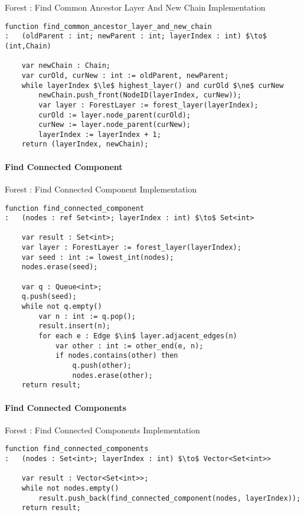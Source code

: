 \begin{stulisting}[H]
\caption{Forest : Find Common Ancestor Layer And New Chain Implementation}
\begin{lstlisting}[style=Default]
function find_common_ancestor_layer_and_new_chain
:	(oldParent : int; newParent : int; layerIndex : int) $\to$ (int,Chain)

	var newChain : Chain;
	var curOld, curNew : int := oldParent, newParent;
	while layerIndex $\le$ highest_layer() and curOld $\ne$ curNew
		newChain.push_front(NodeID(layerIndex, curNew));
		var layer : ForestLayer := forest_layer(layerIndex);
		curOld := layer.node_parent(curOld);
		curNew := layer.node_parent(curNew);
		layerIndex := layerIndex + 1;
	return (layerIndex, newChain);
\end{lstlisting}
\end{stulisting}

\paragraph{Find Connected Component}

\begin{stulisting}[H]
\caption{Forest : Find Connected Component Implementation}
\begin{lstlisting}[style=Default]
function find_connected_component
:	(nodes : ref Set<int>; layerIndex : int) $\to$ Set<int>

	var result : Set<int>;
	var layer : ForestLayer := forest_layer(layerIndex);
	var seed : int := lowest_int(nodes);
	nodes.erase(seed);

	var q : Queue<int>;
	q.push(seed);
	while not q.empty()
		var n : int := q.pop();
		result.insert(n);
		for each e : Edge $\in$ layer.adjacent_edges(n)
			var other : int := other_end(e, n);
			if nodes.contains(other) then
				q.push(other);
				nodes.erase(other);
	return result;
\end{lstlisting}
\end{stulisting}

\paragraph{Find Connected Components}

\begin{stulisting}[H]
\caption{Forest : Find Connected Components Implementation}
\begin{lstlisting}[style=Default]
function find_connected_components
:	(nodes : Set<int>; layerIndex : int) $\to$ Vector<Set<int>>

	var result : Vector<Set<int>>;
	while not nodes.empty()
		result.push_back(find_connected_component(nodes, layerIndex));
	return result;
\end{lstlisting}
\end{stulisting}

